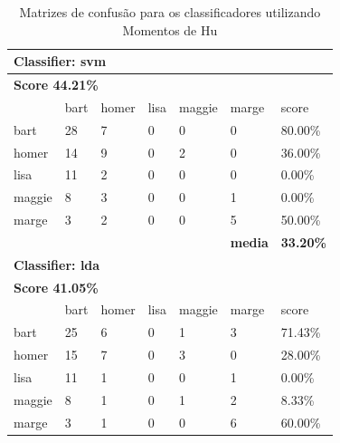 \documentclass[journal]{IEEEtran}
\begin{document}
\begin{table}[!htb]
\centering
\caption{Matrizes de confusão para os classificadores utilizando Momentos de Hu}
\label{tbl:hog}
\small
\singlespacing
\begin{tabular}{l|l|l|l|l|l|l} \hline
\multicolumn{7}{l}{\textbf{Classifier: svm}}                                                \\ \hline
\multicolumn{7}{l}{\textbf{Score 44.21\%}}                                                  \\ \hline
          & bart      & homer     & lisa      & maggie    & marge          & score            \\ \hline
bart      & 28        & 7         & 0         & 0         & 0              & 80.00\%          \\ \hline
homer     & 14        & 9         & 0         & 2         & 0              & 36.00\%          \\ \hline
lisa      & 11        & 2         & 0         & 0         & 0              & 0.00\%           \\ \hline
maggie    & 8         & 3         & 0         & 0         & 1              & 0.00\%           \\ \hline
marge     & 3         & 2         & 0         & 0         & 5              & 50.00\%          \\ \hline
\textbf{} & \textbf{} & \textbf{} & \textbf{} & \textbf{} & \textbf{media} & \textbf{33.20\%} \\ \hline
\multicolumn{7}{l}{\textbf{Classifier: lda}}                                                \\ \hline
\multicolumn{7}{l}{\textbf{Score 41.05\%}}                                                  \\ \hline
          & bart      & homer     & lisa      & maggie    & marge          & score            \\ \hline
bart      & 25        & 6         & 0         & 1         & 3              & 71.43\%          \\ \hline
homer     & 15        & 7         & 0         & 3         & 0              & 28.00\%          \\ \hline
lisa      & 11        & 1         & 0         & 0         & 1              & 0.00\%           \\ \hline
maggie    & 8         & 1         & 0         & 1         & 2              & 8.33\%           \\ \hline
marge     & 3         & 1         & 0         & 0         & 6              & 60.00\%          \\ \hline

\end{tabular}
\end{table}
\end{document}
